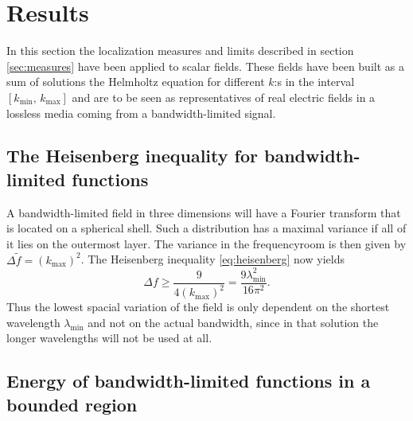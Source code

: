 \documentclass[11pt,a4paper, 
swedish,english %
]{article}
\newcommand{\tf}{\ensuremath{\tilde{f}}}
\begin{document}
\section{Results}
In this section the localization measures and limits described in 
section \ref{sec:measures} have been applied to scalar fields. These 
fields have been built as a sum of solutions the Helmholtz equation for 
different $k$:s in the interval $[k_{\min},\,k_{\max}]$ and are to be 
seen as representatives of real electric fields in a lossless media 
coming from a bandwidth-limited signal.


\subsection{The Heisenberg inequality for bandwidth-limited functions}
\label{sec:Heisenberg_result}
A bandwidth-limited field in three dimensions will have a Fourier transform that is located on a spherical
shell. Such a distribution has a maximal variance if all of it lies on the outermost layer. The variance
in the frequencyroom is then given by $\Delta \tf=(k_{\max})^2$. The Heisenberg inequality \eqref{eq:heisenberg}
now yields
\begin{equation}
\Delta f \geq \frac{9}{4(k_{\max})^2}=\frac{9\lambda_{\min}^2}{16\pi^2}.
\end{equation}
Thus the lowest spacial variation of the field is only dependent on the shortest wavelength $\lambda_{\min}$
and not on the actual bandwidth, since in that solution the longer wavelengths will not be used at all.

\subsection{Energy of bandwidth-limited functions in a bounded region}
\end{document}
